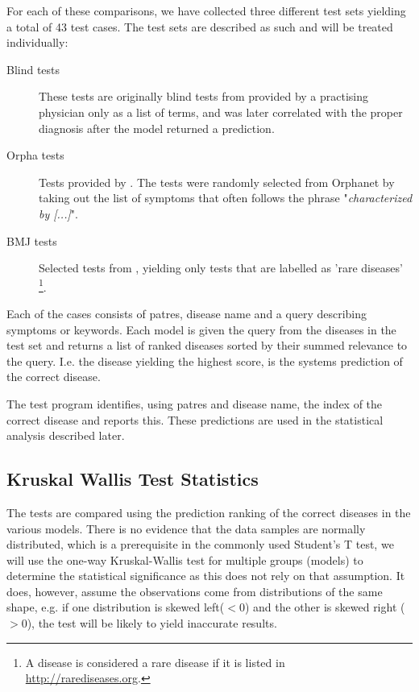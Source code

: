\documentclass[10pt,letterpaper,two column,final]{article}
\begin{document}
For each of these comparisons, we have collected three different test
sets yielding a total of 43 test cases. The test sets are described as
such and will be treated individually:
\begin{description}
\item[Blind tests] These tests are originally blind tests from
\cite{jensenandersen} provided by a practising physician only as a list
of terms, and was later correlated with the proper diagnosis after the
model returned a prediction.
\item[Orpha tests] Tests provided by \cite{jensenandersen}. The tests were randomly selected
from Orphanet by taking out the list of symptoms that often follows the phrase "\textit{characterized by [...]}".
\item[BMJ tests] Selected tests from \cite{googlingdiagnosis}, yielding
only tests that are labelled as 'rare diseases' \footnote{A disease is
considered a rare disease if it is listed in
\url{http://rarediseases.org}.}.
\end{description}

Each of the cases consists of patres, disease name and a query
describing symptoms or keywords. Each model is given the query from the
diseases in the test set and returns a list of ranked diseases sorted by
their summed relevance to the query. I.e. the disease yielding the
highest score, is the systems prediction of the correct disease.

The test program identifies, using patres and disease name, the index
of the correct disease and reports this. These predictions are used in
the statistical analysis described later.


\subsection{Kruskal Wallis Test Statistics}
The tests are compared using the prediction ranking of the correct
diseases in the various models. There is no evidence that the data
samples are normally distributed, which is a prerequisite in the
commonly used Student's T test, we will use the one-way Kruskal-Wallis
\cite{kruskalwallis} test for multiple groups (models) to determine the
statistical significance as this does not rely on that assumption. It
does, however, assume the observations come from distributions of the
same shape, e.g. if one distribution is skewed left($<0$) and the other
is skewed right ($>0$), the test will be likely to yield inaccurate
results.
\end{document}

